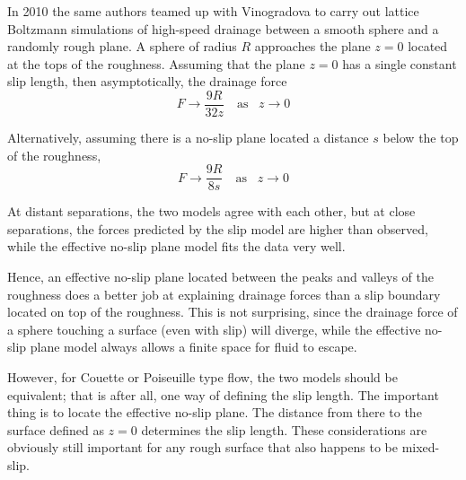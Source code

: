 \documentclass[a4paper]{report}
\begin{document}
In 2010 the same authors teamed up with Vinogradova \cite{KunertHartingVinogradova2010} to carry out lattice Boltzmann simulations of high-speed drainage between a smooth sphere and a randomly rough plane.  A sphere of radius $R$ approaches the plane $z=0$ located at the tops of the roughness.  Assuming that the plane $z=0$ has a single constant slip length, then asymptotically, the drainage force
\[ F \rightarrow \frac{9R}{32z} \quad \text{as} \;\;\; z \rightarrow 0 \]

Alternatively, assuming there is a no-slip plane located a distance $s$ below the top of the roughness,
\[ F \rightarrow \frac{9R}{8s} \quad \text{as} \;\;\; z \rightarrow 0 \]

At distant separations, the two models agree with each other, but at close separations, the forces predicted by the slip model are higher than observed, while the effective no-slip plane model fits the data very well.  

\vspace*{1em}

Hence, an effective no-slip plane located between the peaks and valleys of the roughness does a better job at explaining drainage forces than a slip boundary located on top of the roughness.  This is not surprising, since the drainage force of a sphere touching a surface (even with slip) will diverge, while the effective no-slip plane model always allows a finite space for fluid to escape.

However, for Couette or Poiseuille type flow, the two models should be equivalent; that is after all, one way of defining the slip length.  The important thing is to locate the effective no-slip plane.  The distance from there to the surface defined as $z=0$ determines the slip length.  These considerations are obviously still  important for any rough surface that also happens to be mixed-slip.

\begin{center}
\end{center}
\end{document}
